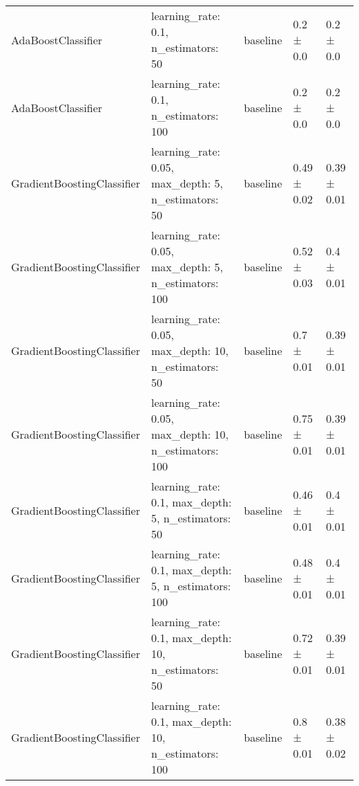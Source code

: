 \begin{tabular}{lllll}
    AdaBoostClassifier         & learning\_rate: 0.1, n\_estimators: 50                                                                                               & baseline               & 0.2 ± 0.0               & 0.2 ± 0.0                    \\
    AdaBoostClassifier         & learning\_rate: 0.1, n\_estimators: 100                                                                                              & baseline               & 0.2 ± 0.0               & 0.2 ± 0.0                    \\
    GradientBoostingClassifier & learning\_rate: 0.05, max\_depth: 5, n\_estimators: 50                                                                               & baseline               & 0.49 ± 0.02             & 0.39 ± 0.01                  \\
    GradientBoostingClassifier & learning\_rate: 0.05, max\_depth: 5, n\_estimators: 100                                                                              & baseline               & 0.52 ± 0.03             & 0.4 ± 0.01                   \\
    GradientBoostingClassifier & learning\_rate: 0.05, max\_depth: 10, n\_estimators: 50                                                                              & baseline               & 0.7 ± 0.01              & 0.39 ± 0.01                  \\
    GradientBoostingClassifier & learning\_rate: 0.05, max\_depth: 10, n\_estimators: 100                                                                             & baseline               & 0.75 ± 0.01             & 0.39 ± 0.01                  \\
    GradientBoostingClassifier & learning\_rate: 0.1, max\_depth: 5, n\_estimators: 50                                                                                & baseline               & 0.46 ± 0.01             & 0.4 ± 0.01                   \\
    GradientBoostingClassifier & learning\_rate: 0.1, max\_depth: 5, n\_estimators: 100                                                                               & baseline               & 0.48 ± 0.01             & 0.4 ± 0.01                   \\
    GradientBoostingClassifier & learning\_rate: 0.1, max\_depth: 10, n\_estimators: 50                                                                               & baseline               & 0.72 ± 0.01             & 0.39 ± 0.01                  \\
    GradientBoostingClassifier & learning\_rate: 0.1, max\_depth: 10, n\_estimators: 100                                                                              & baseline               & 0.8 ± 0.01              & 0.38 ± 0.02                  \\
    \bottomrule
\end{tabular}
